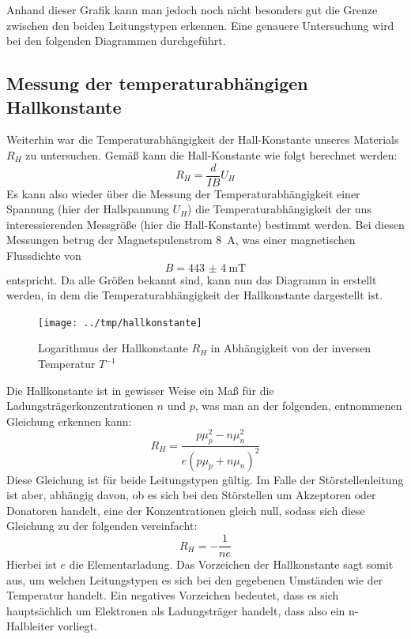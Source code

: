Anhand dieser Grafik kann man jedoch noch nicht besonders gut die Grenze
zwischen den beiden Leitungstypen erkennen. Eine genauere
Untersuchung wird bei den folgenden Diagrammen durchgeführt.

\subsection{Messung der temperaturabhängigen Hallkonstante}

Weiterhin war die Temperaturabhängigkeit der Hall-Konstante unseres Materials
$R_H$ zu untersuchen. Gemäß \cite[Gl. (XIV.2)]{ibach} kann die Hall-Konstante
wie folgt berechnet werden: 
\begin{equation}
R_H = \frac{d}{I B} U_H
\end{equation}
Es kann also wieder über die Messung der Temperaturabhängigkeit einer Spannung
(hier der Hallspannung $U_H$) die Temperaturabhängigkeit der uns
interessierenden Messgröße (hier die Hall-Konstante) bestimmt werden. Bei
diesen Messungen betrug der Magnetspulenstrom \SI{8}{\ampere}, was einer
magnetischen Flussdichte von
\begin{equation}
 B=\SI{443(4)}{\milli\tesla}
\end{equation}
entspricht.
Da alle Größen bekannt sind, kann nun das Diagramm in 
erstellt werden, in dem die Temperaturabhängigkeit der Hallkonstante dargestellt ist.
\begin{figure}[htb]
   \centering
   \texttt{[image: ../tmp/hallkonstante]}
   \caption{Logarithmus der Hallkonstante $R_H$ in Abhängigkeit von der inversen Temperatur $T^{-1}$}
   \label{fig:hallkonstante}
\end{figure}

Die Hallkonstante ist in gewisser Weise ein Maß für die
Ladungsträgerkonzentrationen $n$ und $p$, was man an der folgenden, \cite[Gl.
XIV.5]{ibach} entnommenen Gleichung erkennen kann:
\begin{equation}
R_H = \frac{pμ_p^2-nμ_n^2}{e(pμ_p+nμ_n)^2}
\label{eqn:hallkonst_lang}
\end{equation}
Diese Gleichung ist für beide Leitungstypen gültig. Im Falle der
Störstellenleitung ist aber, abhängig davon, ob es sich bei den Störstellen um
Akzeptoren oder Donatoren handelt, eine der Konzentrationen gleich null, sodass
sich diese Gleichung zu der folgenden vereinfacht:
\begin{equation}
\label{eqn:hallkonst}
R_H = -\frac{1}{ne}
\end{equation}
Hierbei ist $e$ die Elementarladung. Das Vorzeichen der Hallkonstante sagt
somit aus, um welchen Leitungstypen es sich bei den gegebenen Umständen wie
der Temperatur handelt. Ein negatives Vorzeichen bedeutet, dass es sich
hauptsächlich um Elektronen als Ladungsträger handelt, dass also ein
n-Halbleiter vorliegt.

